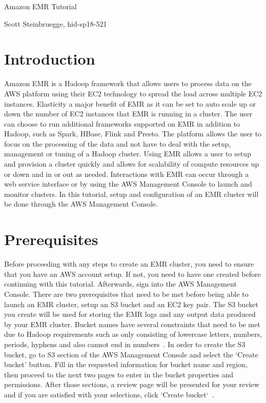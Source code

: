 {\Huge Amazon EMR Tutorial\par}
{\Large Scott Steinbruegge, hid-sp18-521\par}

\section{Introduction}

Amazon EMR is a Hadoop framework that allows users to process data on the AWS 
platform using their EC2 technology to spread the load across multiple EC2 
instances. Elasticity a major benefit of EMR as it can be set to auto scale 
up or down the number of EC2 instances that EMR is running in a cluster. The 
user can choose to run additional frameworks supported on EMR in addition 
to Hadoop, such as Spark, HBase, Flink and Presto. The platform allows the 
user to focus on the processing of the data and not have to deal with the 
setup, management or tuning of a Hadoop cluster. Using EMR allows a user 
to setup and provision a cluster quickly and allows for scalability of 
compute resources up or down and in or out as needed. Interactions with 
EMR can occur through a web service interface or by using the AWS 
Management Console to launch and monitor clusters. In this tutorial, 
setup and configuration of an EMR cluster will be done through the AWS 
Management Console. 

\section{Prerequisites}

Before proceeding with any steps to create an EMR cluster, you need to 
ensure that you have an AWS account setup. If not, you need to have one 
created before continuing with this tutorial. Afterwards, sign into the 
AWS Management Console. There are two prerequisites that need to be met 
before being able to launch an EMR cluster, setup an S3 bucket and an EC2 
key pair. The S3 bucket you create will be used for storing the EMR logs 
and any output data produced by your EMR cluster. Bucket names have several 
constraints that need to be met due to Hadoop requirements such as only 
consisting of lowercase letters, numbers, periods, hyphens and also cannot 
end in numbers~\cite{hid-sp18-521-prereq}. In order to create the S3 bucket, 
go to S3 section of the AWS Management Console and select the `Create bucket' 
button. Fill in the requested information for bucket name and region, then 
proceed to the next two pages to enter in the bucket properties and 
permissions. After those sections, a review page will be presented for your 
review and if you are satisfied with your selections, 
click `Create bucket`~\cite{hid-sp18-521-s3bucket}. 

